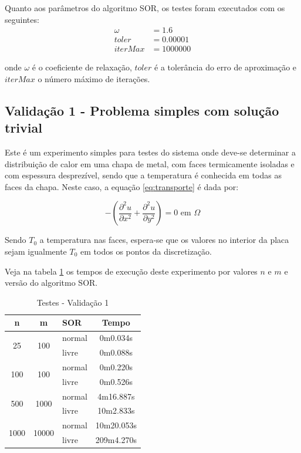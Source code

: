 \documentclass[
	11pt,				%
	oneside,			%
	a4paper,			%
	english,			%
	brazil,				%
	]{article}
\begin{document}
Quanto aos parâmetros do algoritmo SOR, os testes foram executados com os 
seguintes:
\begin{align*}
\omega &= 1.6 \\
toler &= 0.00001 \\
iterMax &= 1000000 
\end{align*}

\noindent onde $\omega$ é o coeficiente de relaxação, $toler$ é a tolerância do 
erro de aproximação e $iterMax$ o número máximo de iterações.

\subsection{Validação 1 - Problema simples com solução trivial}
Este é um experimento simples para testes do sistema onde deve-se determinar a 
distribuição de calor em uma chapa de metal, com faces termicamente isoladas e 
com espessura desprezível, sendo que a temperatura é conhecida em todas as 
faces da chapa. Neste caso, a equação \eqref{eq:transporte} é dada por:

\begin{equation} \label{eq:v1}
- \left(\frac{\partial^2 u}{\partial x^2} + \frac{\partial^2 u}{\partial 
y^2}\right) = 0 \text{ em } \Omega
\end{equation}

Sendo $T_0$ a temperatura nas faces, espera-se que os valores no interior da 
placa sejam igualmente $T_0$ em todos os pontos da discretização.

Veja na tabela \ref{tab:tv1} os tempos de execução deste experimento por 
valores $n$ e $m$ e versão do algoritmo SOR.

\begin{table}[ht]
\centering
\begin{tabular}{|c|c|l|c|}
\hline 
\textbf{n} & \textbf{m} & \textbf{SOR} & \textbf{Tempo} \\
\hline
\multirow{2}{*}{25}    & \multirow{2}{*}{100}   & normal & 0m0.034s \\
                       &                        & livre  & 0m0.088s \\
\hline
\multirow{2}{*}{100}   & \multirow{2}{*}{100}   & normal & 0m0.220s \\
                       &                        & livre  & 0m0.526s \\
\hline
\multirow{2}{*}{500}   & \multirow{2}{*}{1000}  & normal & 4m16.887s \\
                       &                        & livre  & 10m2.833s \\
\hline
\multirow{2}{*}{1000}  & \multirow{2}{*}{10000} & normal & 10m20.053s \\
                       &                        & livre  & 209m4.270s \\
\hline
\end{tabular}
\caption{Testes - Validação 1}
\label{tab:tv1}
\end{table}
\end{document}
